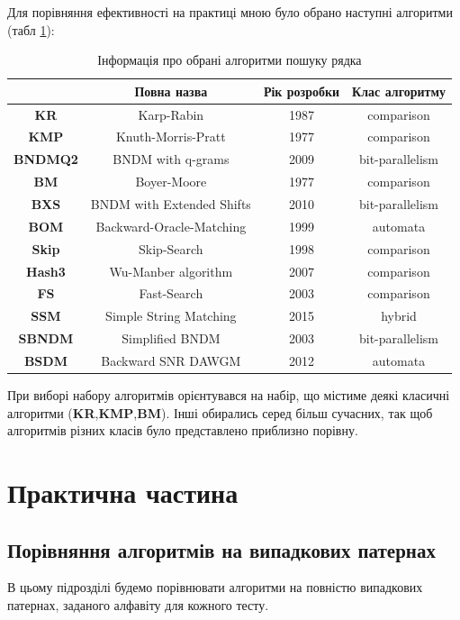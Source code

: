 \documentclass[a4paper,14pt]{extarticle} %
\begin{document}
	Для порівняння ефективності на практиці мною було обрано наступні алгоритми (табл \ref{table:string_algorithms}):

	\begin{table}[H]
		\centering
		\small
		\begin{tabular}{|c|c|c|c|}
			\hline
			& \textbf{Повна назва} & \textbf{Рік розробки} & \textbf{Клас алгоритму} \\ 
			\hline
			\textbf{KR} & Karp-Rabin & 1987 & comparison \\ 
			\hline
			\textbf{KMP} & Knuth-Morris-Pratt & 1977 & comparison \\ 
			\hline
			\textbf{BNDMQ2} & BNDM with q-grams & 2009 & bit-parallelism \\ 
			\hline
			\textbf{BM} & Boyer-Moore & 1977 & comparison \\ 
			\hline
			\textbf{BXS} & BNDM with Extended Shifts &  2010 & bit-parallelism \\ 
			\hline
			\textbf{BOM} &  Backward-Oracle-Matching & 1999 & automata \\ 
			\hline
			\textbf{Skip} & Skip-Search  & 1998 & comparison \\ 
			\hline
			\textbf{Hash3} & Wu-Manber algorithm	 & 2007 & comparison \\ 
			\hline
			\textbf{FS} & Fast-Search &  2003 & comparison \\ 
			\hline
			\textbf{SSM} & Simple String Matching & 2015 & hybrid \\ 
			\hline
			\textbf{SBNDM} & Simplified BNDM & 2003 & bit-parallelism \\ 
			\hline
			\textbf{BSDM} & Backward SNR DAWGM & 2012 & automata \\ 
			\hline
		\end{tabular}
		\caption{Інформація про обрані алгоритми пошуку рядка}
		\label{table:string_algorithms}
	\end{table}

	При виборі набору алгоритмів орієнтувався на набір, що містиме деякі класичні алгоритми (\textbf{KR},\textbf{KMP},\textbf{BM}). Інші обирались серед більш сучасних, так щоб алгоритмів різних класів було представлено приблизно порівну.

	
	\newpage
	\section{Практична частина}
	
	\subsection{Порівняння алгоритмів на випадкових патернах}
	В цьому підрозділі будемо порівнювати алгоритми на повністю випадкових патернах, заданого алфавіту для кожного тесту. 
\end{document}
